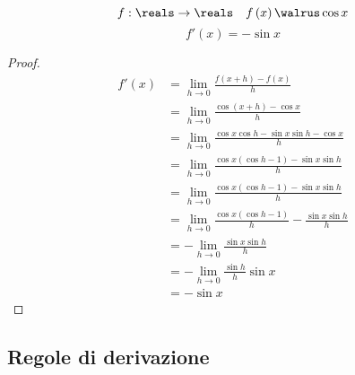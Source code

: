 \begin{lemma}
  $$f:\reals\to\reals\quad f\left(x\right)\walrus \cos x$$
  $$f'\left(x\right)=-\sin x$$
\end{lemma}
\begin{proof}
  \begin{align*}
    f'\left(x\right) & =\lim_{h\to0}\frac{f\left(x+h\right)-f\left(x\right)}{h}                  \\
                     & =\lim_{h\to0}\frac{\cos\left(x+h\right)-\cos x}{h}                        \\                                      
                     & =\lim_{h\to0}\frac{\cos x\cos h-\sin x\sin h-\cos x}{h}                   \\                                      
                     & =\lim_{h\to0}\frac{\cos x\left(\cos h-1\right)-\sin x\sin h}{h}           \\                                      
                     & =\lim_{h\to0}\frac{\cos x\left(\cos h-1\right)-\sin x\sin h}{h}           \\                                      
                     & =\lim_{h\to0}\frac{\cos x\left(\cos h-1\right)}{h}-\frac{\sin x\sin h}{h} \\                                      
                     & =-\lim_{h\to0}\frac{\sin x\sin h}{h}                                      \\                                      
                     & =-\lim_{h\to0}\frac{\sin h}{h}\sin x                                      \\                                      
                     & =-\sin x                                                                  
  \end{align*}
\end{proof}

\subsection{Regole di derivazione}

